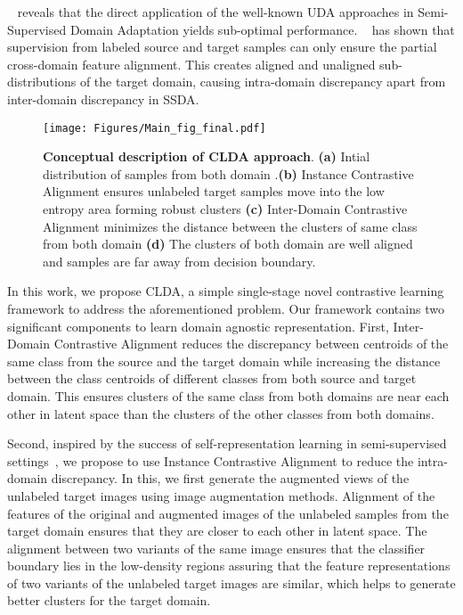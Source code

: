 ~\cite{Saito2019SemiSupervisedDA}  reveals that the direct application of the well-known UDA approaches in Semi-Supervised Domain Adaptation yields sub-optimal performance. ~\cite{Kim2020AttractPA} has shown that supervision from labeled source and target samples can only ensure the partial cross-domain feature alignment. This creates aligned and unaligned sub-distributions of the target domain, causing intra-domain discrepancy apart from inter-domain discrepancy in SSDA.
\begin{figure}
   \centering
    \texttt{[image: Figures/Main\_fig\_final.pdf]}
    \vspace{2mm}
    \caption{\textbf{Conceptual description of CLDA approach}. \textbf{(a)} Intial distribution of samples from both domain .\textbf{(b)} Instance Contrastive Alignment ensures unlabeled target samples move into the low entropy area forming robust clusters \textbf{(c)} Inter-Domain Contrastive Alignment minimizes the distance between the clusters of same class from both domain \textbf{(d)} The clusters of both domain are well aligned and samples are far away from decision boundary.}
    \label{fig:my_label}
\end{figure}

 In this work, we propose CLDA, a simple single-stage novel contrastive learning framework to address the aforementioned problem. Our framework contains two significant components to learn domain agnostic representation. First, Inter-Domain Contrastive Alignment reduces the discrepancy between centroids of the same class from the source and the target domain while increasing the distance between the class centroids of different classes from both source and target domain. This ensures clusters of the same class from both domains are near each other in latent space than the clusters of the other classes from both domains.
 
 Second, inspired by the success of self-representation learning in semi-supervised  settings~\cite{Grill2020BootstrapYO, Chen2020ASF, Singh_2021_CVPR}, we propose to use Instance Contrastive Alignment to reduce the intra-domain discrepancy. In this, we first generate the augmented views of the unlabeled target images using image augmentation methods. Alignment of the features of the original and augmented images of the unlabeled samples from the target domain ensures that they are closer to each other in latent space.  The alignment between two variants of the same image ensures that the classifier boundary lies in the low-density regions assuring that the feature representations of two variants of the unlabeled target images are similar, which helps to generate better clusters for the target domain.
 
